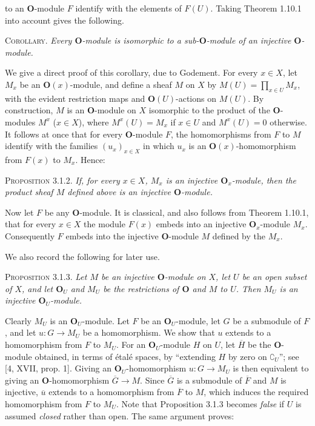 
\noindent to an $\mathbf O$-module $F$ identify with the elements of $F(U)$.
Taking Theorem 1.10.1 into account gives the following.

\indent\textsc{Corollary.} \textit{Every $\mathbf O$-module is isomorphic to a
sub-$\mathbf O$-module of an injective $\mathbf O$-module.}

We give a direct proof of this corollary, due to Godement. For every $x\in X$,
let $M_x$ be an $\mathbf O(x)$-module, and define a sheaf $M$ on $X$ by
$M(U)=\displaystyle\prod_{x\in U}M_x$,
with the evident restriction maps and $\mathbf O(U)$-actions on $M(U)$. By
construction, $M$ is an $\mathbf O$-module on $X$ isomorphic to the product
of the $\mathbf O$-modules $M^x$ ($x\in X$), where $M^x(U)=M_x$ if $x\in U$
and $M^x(U)=0$ otherwise. It follows at once that for every $\mathbf O$-module
$F$, the homomorphisms from $F$ to $M$ identify with the families
$(u_x)_{x\in X}$ in which $u_x$ is an $\mathbf O(x)$-homomorphism from $F(x)$
to $M_x$. Hence:

\indent\textsc{Proposition 3.1.2.} \textit{If, for every $x\in X$, $M_x$ is an
injective $\mathbf O_x$-module, then the product sheaf $M$ defined above is an
injective $\mathbf O$-module.}

Now let $F$ be any $\mathbf O$-module. It is classical, and also follows from
Theorem 1.10.1, that for every $x\in X$ the module $F(x)$ embeds into an
injective $\mathbf O_x$-module $M_x$. Consequently $F$ embeds into the
injective $\mathbf O$-module $M$ defined by the $M_x$.

We also record the following for later use.

\indent\textsc{Proposition 3.1.3.} \textit{Let $M$ be an injective
$\mathbf O$-module on $X$, let $U$ be an open subset of $X$, and let
$\mathbf O_U$ and $M_U$ be the restrictions of $\mathbf O$ and $M$ to $U$.
Then $M_U$ is an injective $\mathbf O_U$-module.}

Clearly $M_U$ is an $\mathbf O_U$-module. Let $F$ be an $\mathbf O_U$-module,
let $G$ be a submodule of $F$, and let $u:G\to M_U$ be a
homomorphism. We show that $u$ extends to a homomorphism from $F$ to $M_U$.
For an $\mathbf O_U$-module $H$ on $U$, let $\overline H$ be the
$\mathbf O$-module obtained, in terms of étalé spaces, by ``extending $H$ by
zero on $\complement_U$''; see [4, XVII, prop. 1]. Giving an $\mathbf O_U$-homomorphism
$u:G\to M_U$ is then equivalent to giving an
$\mathbf O$-homomorphism $\overline G\to M$. Since
$\overline G$ is a submodule of $\overline F$ and $M$ is injective,
$\overline u$ extends to a homomorphism from $\overline F$ to $M$, which
induces the required homomorphism from $F$ to $M_U$. Note that Proposition
3.1.3 becomes \textit{false} if $U$ is assumed \textit{closed} rather than open. The same
argument proves:

